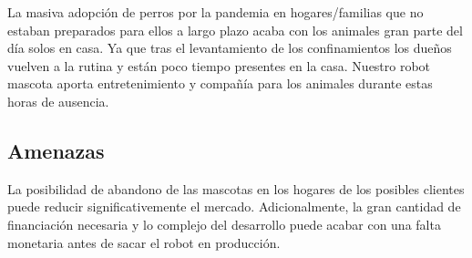 \vspace{\baselineskip}

La masiva adopción de perros por la pandemia en hogares/familias que no estaban preparados para ellos a largo plazo acaba con los animales gran parte del día solos en casa. Ya que tras el levantamiento de los confinamientos los dueños vuelven a la rutina y están poco tiempo presentes en la casa. Nuestro robot mascota aporta entretenimiento y compañía para los animales durante estas horas de ausencia.


\subsection{Amenazas}

La posibilidad de abandono de las mascotas en los hogares de los posibles clientes puede reducir significativemente el mercado. Adicionalmente, la gran cantidad de financiación necesaria y lo complejo del desarrollo puede acabar con una falta monetaria antes de sacar el robot en producción.